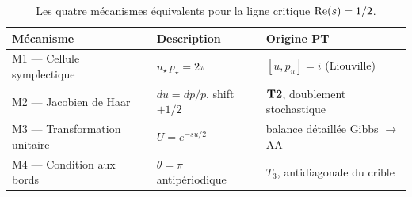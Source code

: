 \begin{table}[ht]
\centering
\begin{tabular}{@{}lll@{}}
\toprule
\textbf{Mécanisme} & \textbf{Description} & \textbf{Origine PT}\\
\midrule
M1 — Cellule symplectique & $u_\star\,p_\star = 2\pi$ & $[u, p_u] = i$ (Liouville)\\
M2 — Jacobien de Haar & $du = dp/p$, shift $+1/2$ & $\textbf{T2}$, doublement stochastique\\
M3 — Transformation unitaire & $U = e^{-su/2}$ & balance détaillée Gibbs $\to$ AA\\
M4 — Condition aux bords & $\theta = \pi$ antipériodique & $T_3$, antidiagonale du crible\\
\bottomrule
\end{tabular}
\caption{Les quatre mécanismes équivalents pour la ligne critique
$\operatorname{Re}(s) = 1/2$.}
\label{tab:quatre_mecanismes}
\end{table}


